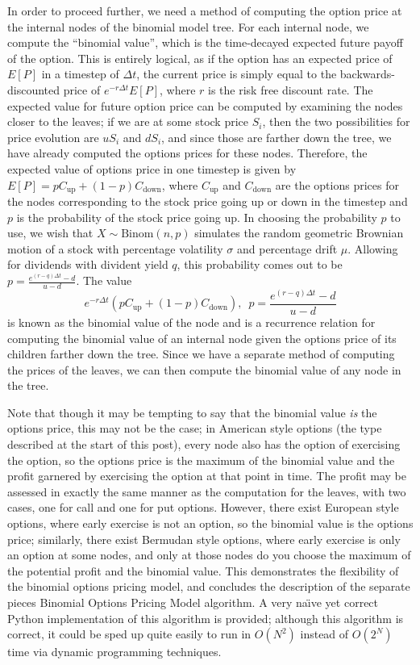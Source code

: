 \documentclass[11pt]{article}
\newcommand\del[1]{\left(#1\right)}
\begin{document}
In order to proceed further, we need a method of computing the option price at the internal nodes of
the binomial model tree. For each internal node, we compute the ``binomial value'', which is the
time-decayed expected future payoff of the option. This is entirely logical, as if the option has an
expected price of $E[P]$ in a timestep of $\Delta t$, the current price is simply equal to the
backwards-discounted price of $e^{-r\Delta t} E[P]$, where $r$ is the risk free discount rate. The
expected value for future option price can be computed by examining the nodes closer to the leaves;
if we are at some stock price $S_i$, then the two possibilities for price evolution are $uS_i$ and
$dS_i$, and since those are farther down the tree, we have already computed the options prices for
these nodes. Therefore, the expected value of options price in one timestep is given by
\(E[P] = pC_\text{up} + (1-p)C_\text{down}\), where $C_\text{up}$ and $C_\text{down}$ are the
options prices for the nodes corresponding to the stock price going up or down in the timestep and
$p$ is the probability of the stock price going up. In choosing the probability $p$ to use, we wish
that $X \sim \text{Binom}(n, p)$ simulates the random geometric Brownian motion of a stock with
percentage volatility $\sigma$ and percentage drift $\mu$. Allowing for dividends with divident yield
$q$, this probability comes out to be $p = \frac{e^{(r-q)\Delta t} - d}{u - d}$. The value
\[e^{-r\Delta t}\del{pC_\text{up} + (1-p)C_\text{down}},\:\;p = \frac{e^{(r-q)\Delta t} - d}{u - d}\]
is known as the binomial value of the node and is a recurrence relation for computing the binomial
value of an internal node given the options price of its children farther down the tree. Since we
have a separate method of computing the prices of the leaves, we can then compute the binomial value
of any node in the tree. 

Note that though it may be tempting to say that the binomial value \emph{is}
the options price, this may not be the case; in American style options (the
type described at the start of this post), every node also has the option of
exercising the option, so the options price is the maximum of the binomial
value and the profit garnered by exercising the option at that point in time.
The profit may be assessed in exactly the same manner as the computation for
the leaves, with two cases, one for call and one for put options. However,
there exist European style options, where early exercise is not an option, so
the binomial value is the options price; similarly, there exist Bermudan style
options, where early exercise is only an option at some nodes, and only at
those nodes do you choose the maximum of the potential profit and the binomial
value. This demonstrates the flexibility of the binomial options pricing model,
and concludes the description of the separate pieces Binomial Options Pricing
Model algorithm. A very na\"{\i}ve yet correct Python implementation of this
algorithm is provided; although this algorithm is correct, it could be sped up
quite easily to run in $O(N^2)$ instead of $O(2^N)$ time via dynamic
programming techniques.
\end{document}

